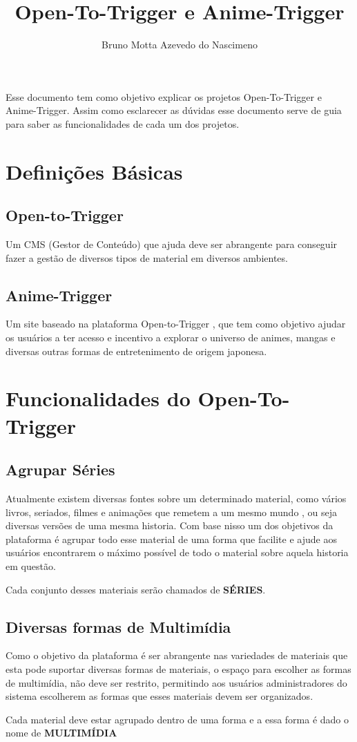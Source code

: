 \documentclass{abnt}
\title{Open-To-Trigger e Anime-Trigger}
\author{Bruno Motta Azevedo do Nascimeno}
\begin{document}

\capa

\begin{resumo}
Esse documento tem como objetivo explicar os projetos Open-To-Trigger e Anime-Trigger. Assim como esclarecer as dúvidas esse documento serve de guia para saber as funcionalidades de cada um dos projetos.
\end{resumo}

\sumario

\chapter{Definições Básicas}
\section*{ Open-to-Trigger}
Um CMS (Gestor de Conteúdo) que ajuda deve ser abrangente para conseguir fazer a gestão de diversos tipos de material em diversos ambientes.

\section*{Anime-Trigger}
Um site baseado na plataforma Open-to-Trigger , que tem como objetivo ajudar os usuários a ter acesso e incentivo a explorar o universo de animes, mangas e diversas outras formas de entretenimento de origem japonesa.

\chapter*{Funcionalidades do Open-To-Trigger}
\section{Agrupar Séries}
Atualmente existem diversas fontes sobre um determinado material, como vários livros, seriados, filmes e animações que remetem a um mesmo mundo , ou seja diversas versões de uma mesma historia. Com base nisso um dos objetivos da plataforma é agrupar todo esse material de uma forma que facilite e ajude aos usuários encontrarem o máximo possível de todo o material sobre aquela historia em questão.
\par
Cada conjunto desses materiais serão chamados de \textbf{SÉRIES}.
\section{Diversas formas de Multimídia}
Como o objetivo da plataforma é ser abrangente nas variedades de materiais que esta pode suportar diversas formas de materiais, o espaço para escolher as formas de multimídia, não deve ser restrito, permitindo aos usuários administradores do sistema escolherem as formas que esses materiais devem ser organizados.
\par
Cada material deve estar agrupado dentro de uma forma e a essa forma é dado o nome de \textbf{MULTIMÍDIA}
\end{document}
